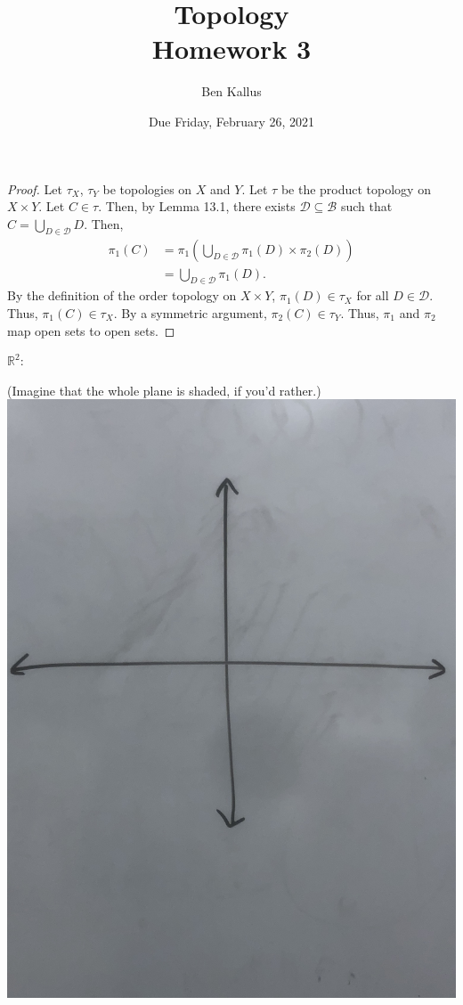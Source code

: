 \documentclass{article}
\date{Due Friday, February 26, 2021}
\author{Ben Kallus}
\title{Topology \\ Homework 3}
\newcommand{\R}{\mathbb R}
\newcommand{\B}{\mathcal B}
\begin{document}
\pagecolor{black}
\color{white}
\maketitle

\begin{proof}
    Let $\tau_X$, $\tau_Y$ be topologies on $X$ and $Y$.
    Let $\tau$ be the product topology on $X \times Y$.
    Let $C \in \tau$.
    Then, by Lemma 13.1, there exists $\mathcal D \subseteq \B$ such that $C = \bigcup\limits_{D \in \mathcal D} D$.
    Then,
    \begin{align*}
    \pi_1(C) &= \pi_1\left(\bigcup\limits_{D \in \mathcal D} \pi_1(D) \times \pi_2(D) \right) \\
    &= \bigcup\limits_{D \in \mathcal D} \pi_1(D).
    \end{align*}
    By the definition of the order topology on $X \times Y$, $\pi_1(D) \in \tau_X$ for all $D \in \mathcal D$.
    Thus, $\pi_1(C) \in \tau_X$.
    By a symmetric argument, $\pi_2(C) \in \tau_Y$.
    Thus, $\pi_1$ and $\pi_2$ map open sets to open sets.
\end{proof}

\newpage{}
\begin{center}
$\R^2:$

(Imagine that the whole plane is shaded, if you'd rather.)
\medskip
\includegraphics[scale=.05]{IMG-0797.jpg}
\end{center}
\end{document}
